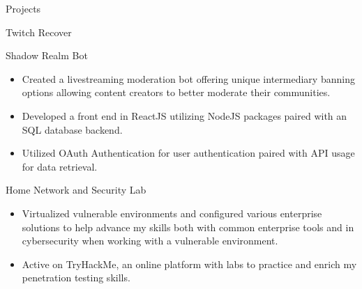 \documentclass{article}
\newlength{\tabin}
\newlength{\secsep}
\newcommand{\lineunder}{\vspace*{-8pt} \\ \hspace*{-6pt} \hrulefill \\ \vspace*{-15pt}}
\newenvironment{tabbedsection}[1]{
  \begin{list}{}{
      \setlength{\itemsep}{0pt}
      \setlength{\labelsep}{0pt}
      \setlength{\labelwidth}{0pt}
      \setlength{\leftmargin}{\tabin}
      \setlength{\rightmargin}{\tabin}
      \setlength{\listparindent}{0pt}
      \setlength{\parsep}{0pt}
      \setlength{\parskip}{0pt}
      \setlength{\partopsep}{0pt}
      \setlength{\topsep}{#1}
    }
  \item[]
}{\end{list}}
\newenvironment{resume_section}[1]{
  \filbreak
  \vspace{2\secsep}
  \textsc{\large#1}
  \lineunder
  \begin{tabbedsection}{\secsep}
}{\end{tabbedsection}}
\newenvironment{resume_subsection}[2][]{
  \textbf{#2} \hfill {\normalsize #1} \hspace{-5em}
  \begin{tabbedsection}{0.5\secsep}
}{\end{tabbedsection}}
\newenvironment{subitems}{
  \renewcommand{\labelitemi}{-}
  \begin{itemize}
      \setlength{\labelsep}{1em}
}{\end{itemize}}
\begin{document}
\begin{resume_section}{Projects}
\begin{resume_subsection}{Twitch Recover}
\begin{subitems}
		\end{subitems}
	\end{resume_subsection}
	\vspace{3\secsep}
	\begin{resume_subsection}{Shadow Realm Bot}
		\begin{subitems}
			\item Created a livestreaming moderation bot offering unique intermediary banning options allowing content creators to better moderate their communities.
			\item Developed a front end in ReactJS utilizing NodeJS packages paired with an SQL database backend.
			\item Utilized OAuth Authentication for user authentication paired with API usage for data retrieval.
		\end{subitems}
	\end{resume_subsection}
	\vspace{3\secsep}
  	\begin{resume_subsection}{Home Network and Security Lab}
  		\begin{subitems}
  			\item Virtualized vulnerable environments and configured various enterprise solutions to help advance my skills both with common enterprise tools and in cybersecurity when working with a vulnerable environment.
  			\item Active on TryHackMe, an online platform with labs to practice and enrich my penetration testing skills.
  		\end{subitems}
  	\end{resume_subsection}
\end{resume_section}

\vspace{2\secsep}
\end{document}

